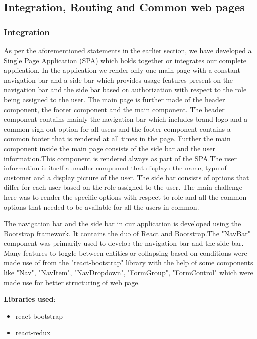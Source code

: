 \subsection{Integration, Routing and Common web pages }

\subsubsection{Integration}
As per the aforementioned statements in the earlier section, we have developed a Single Page Application (SPA) which holds together or integrates our complete application. In the application we render only one main page with a constant navigation bar and a side bar which provides usage features present on the navigation bar and the side bar based on authorization with respect to the role being assigned to the user.
The main page is further made of the header component, the footer component and the main component. The header component contains mainly the navigation bar which includes brand logo and a common sign out option for all users and the footer component contains a common footer that is rendered at all times in the page.
Further the main component inside the main page consists of the side bar and the user information.This component is rendered always as part of the SPA.The user information is itself a smaller component that displays the name, type of customer and a display picture of the user. The side bar consists of options that differ for each user based on the role assigned to the user. The main challenge here was to render the specific options with respect to role and all the common options that needed to be available for all the users in common.

The navigation bar and the side bar in our application is developed using the Bootstrap framework. It contains the duo of React and Bootstrap.The "NavBar" component was primarily used to develop the navigation bar and the side bar. Many features to toggle between entities or collapsing based on conditions were made use of from the "react-bootstrap" library with the help of some components like "Nav", "NavItem", "NavDropdown", "FormGroup", "FormControl" which were made use for better structuring of web page.

\textbf{Libraries used}:
\begin{itemize}
    \item react-bootstrap
    \item react-redux
\end{itemize}

